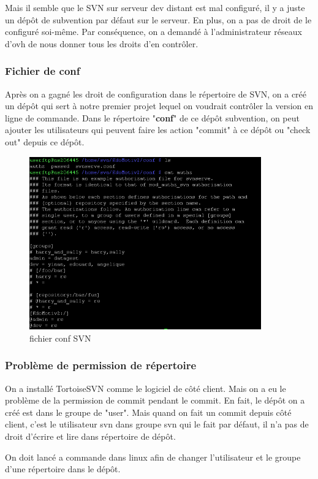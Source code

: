 Mais il semble que le SVN sur serveur dev distant est mal configuré, il y a juste un dépôt de subvention par défaut sur le serveur. En plus, on a pas de droit de le configuré soi-même. Par conséquence, on a demandé  à l'administrateur réseaux d'ovh de nous donner tous les droits d'en contrôler. 

\subsubsection{Fichier de conf}
Après on a gagné les droit de configuration dans le répertoire de SVN, on a créé un dépôt qui sert à notre premier projet lequel on voudrait contrôler la version en ligne de commande. Dans le répertoire "\textbf{conf}" de ce dépôt subvention, on peut ajouter les utilisateurs qui peuvent faire les action "commit" à ce dépôt  ou "check out" depuis ce dépôt. 
\begin{figure}[hbtp]
\center
\includegraphics[width=10cm]{body/images/conf-svn.png}
\caption{fichier conf SVN}
\end{figure}


\subsubsection{Problème de permission de répertoire }
On a installé TortoiseSVN comme le logiciel de côté client.  Mais on a eu le problème de la permission de commit pendant le commit. En fait, le dépôt on a créé est dans le groupe de "user". Mais quand on fait un commit depuis côté client, c'est le utilisateur svn dans groupe svn qui le fait par défaut, il n'a pas de droit d'écrire et lire dans répertoire de dépôt.

On doit lancé a commande dans linux afin de changer l'utilisateur et le groupe d'une répertoire dans le dépôt. 

